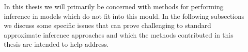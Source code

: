 In this thesis we will primarily be concerned with methods for performing inference in models which do not fit into this mould. In the following subsections we discuss some specific issues that can prove challenging to standard approximate inference approaches and which the methods contributed in this thesis are intended to help address.




